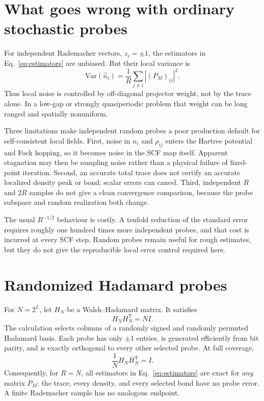 \documentclass[11pt,a4paper]{article}
\begin{document}
\section{\hspace{0.5em}What goes wrong with ordinary stochastic probes}
For independent Rademacher vectors, $z_i=\pm1$, the estimators in
Eq.~\eqref{eq:estimators} are unbiased. But their local variance is
\begin{equation}
 \mathrm{Var}(\widehat n_i)=\frac1R\sum_{j\ne i}|(P_M)_{ij}|^2 .
 \label{eq:variance}
\end{equation}
Thus local noise is controlled by off-diagonal projector weight, not by the
trace alone. In a low-gap or strongly quasiperiodic problem that weight can be
long ranged and spatially nonuniform.

Three limitations make independent random probes a poor production default for
self-consistent local fields. First, noise in $n_i$ and $\rho_{ij}$ enters the
Hartree potential and Fock hopping, so it becomes noise in the SCF map itself.
Apparent stagnation may then be sampling noise rather than a physical failure
of fixed-point iteration. Second, an accurate total trace does not certify an
accurate localized density peak or bond: scalar errors can cancel. Third,
independent $R$ and $2R$ samples do not give a clean convergence comparison,
because the probe subspace and random realization both change.

The usual $R^{-1/2}$ behaviour is costly. A tenfold reduction of the standard
error requires roughly one hundred times more independent probes, and that
cost is incurred at every SCF step. Random probes remain useful for rough
estimates, but they do not give the reproducible local error control required
here.

\section{\hspace{0.5em}Randomized Hadamard probes}
For $N=2^L$, let $H_N$ be a Walsh--Hadamard matrix. It satisfies
\begin{equation}
 H_NH_N^\mathsf T=NI .
\end{equation}
The calculation selects columns of a randomly signed and randomly permuted
Hadamard basis. Each probe has only $\pm1$ entries, is generated efficiently
from bit parity, and is exactly orthogonal to every other selected probe. At
full coverage,
\begin{equation}
 \frac1N H_NH_N^\mathsf T=I.
 \label{eq:hadamardexact}
\end{equation}
Consequently, for $R=N$, all estimators in Eq.~\eqref{eq:estimators} are exact
for \emph{any} matrix $P_M$: the trace, every density, and every selected bond
have no probe error. A finite Rademacher sample has no analogous endpoint.
\end{document}
